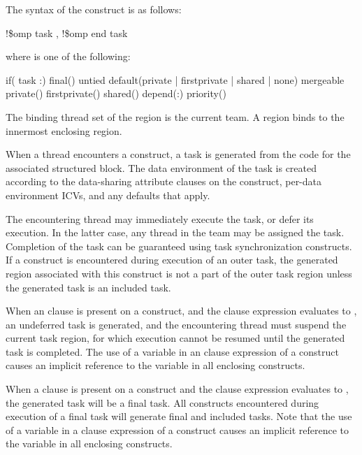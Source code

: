 \fortranspecificstart
The syntax of the  construct is as follows: 

\begin{boxedcode}
!\$omp task \plc{[clause[ [},\plc{] clause] ... ]}
!\$omp end task
\end{boxedcode}

where  is one of the following:

\begin{indentedcodelist}
if(\plc{[} task :\plc{] scalar-logical-expression})
final()
untied
default(private \textnormal{|} firstprivate \textnormal{|} shared \textnormal{|} none)
mergeable
private()
firstprivate()
shared()
depend(:)
priority()
\end{indentedcodelist}
\fortranspecificend

\binding
The binding thread set of the  region is the current team. A  region binds to 
the innermost enclosing  region. 

\descr
When a thread encounters a  construct, a task is generated from the code for the 
associated structured block. The data environment of the task is created according to the 
data-sharing attribute clauses on the  construct, per-data environment ICVs, and 
any defaults that apply.

The encountering thread may immediately execute the task, or defer its execution. In the 
latter case, any thread in the team may be assigned the task. Completion of the task can 
be guaranteed using task synchronization constructs. 
If a  construct is encountered during execution of an outer
task, the generated  region associated with this construct is not a
part of the outer task region unless the generated task is
an included task.

When an  clause is present on a  construct, and the  clause expression 
evaluates to , an undeferred task is generated, and the encountering thread must 
suspend the current task region, for which execution cannot be resumed until the 
generated task is completed. The use of a variable in an  clause expression 
of a  construct causes an implicit reference to the variable in all enclosing 
constructs.

When a  clause is present on a  construct and the  clause expression 
evaluates to , the generated task will be a final task. All  constructs 
encountered during execution of a final task will generate final and included tasks. Note 
that the use of a variable in a  clause expression of a  construct causes an 
implicit reference to the variable in all enclosing constructs.

